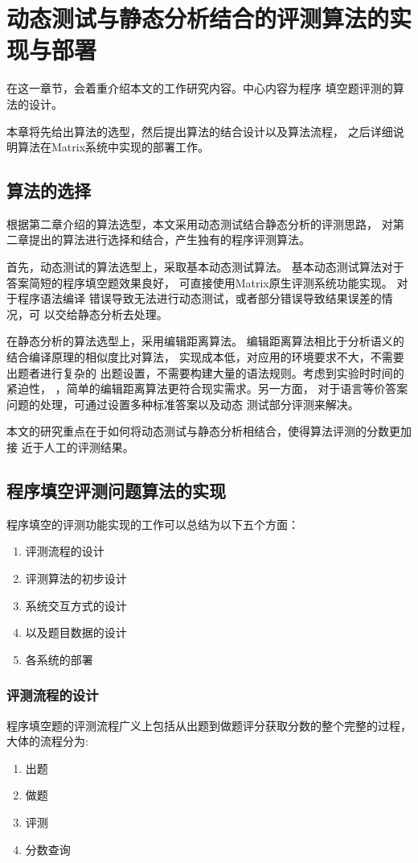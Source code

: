\chapter{动态测试与静态分析结合的评测算法的实现与部署}
\label{cha:achievement}

在这一章节，会着重介绍本文的工作研究内容。中心内容为程序
填空题评测的算法的设计。

本章将先给出算法的选型，然后提出算法的结合设计以及算法流程，
之后详细说明算法在Matrix系统中实现的部署工作。

\section{算法的选择}
根据第二章介绍的算法选型，本文采用动态测试结合静态分析的评测思路，
对第二章提出的算法进行选择和结合，产生独有的程序评测算法。

首先，动态测试的算法选型上，采取基本动态测试算法。
基本动态测试算法对于答案简短的程序填空题效果良好，
可直接使用Matrix原生评测系统功能实现。
对于程序语法编译
错误导致无法进行动态测试，或者部分错误导致结果误差的情况，可
以交给静态分析去处理。

在静态分析的算法选型上，采用编辑距离算法。
编辑距离算法相比于分析语义的结合编译原理的相似度比对算法，
实现成本低，对应用的环境要求不大，不需要出题者进行复杂的
出题设置，不需要构建大量的语法规则。考虑到实验时时间的紧迫性，
，简单的编辑距离算法更符合现实需求。另一方面，
对于语言等价答案问题的处理，可通过设置多种标准答案以及动态
测试部分评测来解决。

本文的研究重点在于如何将动态测试与静态分析相结合，使得算法评测的分数更加接
近于人工的评测结果。

\section{程序填空评测问题算法的实现}
程序填空的评测功能实现的工作可以总结为以下五个方面：
\begin{enumerate}
  \item 评测流程的设计
  \item 评测算法的初步设计
  \item 系统交互方式的设计
  \item 以及题目数据的设计
  \item 各系统的部署
\end{enumerate}

\subsection{评测流程的设计}
程序填空题的评测流程广义上包括从出题到做题评分获取分数的整个完整的过程，大体的流程分为:
\begin{enumerate}
  \item 出题
  \item 做题
  \item 评测
  \item 分数查询
\end{enumerate}

